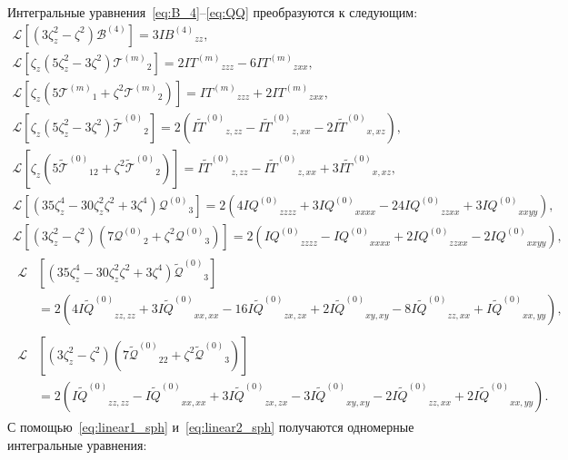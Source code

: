\documentclass[a4paper,12pt]{article}
\newcommand{\B}{\ensuremath{\mathcal{B}^{(4)}}}
\newcommand{\Q}{\ensuremath{\mathcal{Q}^{(0)}}}
\newcommand{\T}[1]{\ensuremath{\mathcal{T}^{(#1)}}}
\newcommand{\TT}{\ensuremath{\tilde{\mathcal{T}}^{(0)}}}
\newcommand{\QQ}{\ensuremath{\tilde{\mathcal{Q}}^{(0)}}}
\newcommand{\IF}[2][0]{\ensuremath{I{#2}^{(#1)}}}
\newcommand{\IFF}[1]{\ensuremath{I\tilde{#1}^{(0)}}}
\begin{document}
Интегральные уравнения~\eqref{eq:B_4}--\eqref{eq:QQ} преобразуются к следующим:
\begin{gather}
    \mathcal{L}\left[\left(3\zeta_z^2 - \zeta^2\right)\B\right]
        = 3\IF[4]{B}_{zz}, \\[6pt]
    \mathcal{L}\left[\zeta_z\left(5\zeta_z^2 - 3\zeta^2\right)\T{m}_2\right]
        = 2\IF[m]{T}_{zzz} - 6\IF[m]{T}_{zxx}, \\
    \mathcal{L}\left[\zeta_z\left(5\T{m}_1 + \zeta^2\T{m}_2\right)\right]
        = \IF[m]{T}_{zzz} + 2\IF[m]{T}_{zxx}, \\[6pt]
    \mathcal{L}\left[\zeta_z\left(5\zeta_z^2 - 3\zeta^2\right)\TT_2\right]
        = 2\left(\IFF{T}_{z,zz} - \IFF{T}_{z,xx} - 2\IFF{T}_{x,xz}\right), \\
    \mathcal{L}\left[\zeta_z\left(5\TT_{12} + \zeta^2\TT_2\right)\right]
        = \IFF{T}_{z,zz} - \IFF{T}_{z,xx} + 3\IFF{T}_{x,xz}, \\[6pt]
    \mathcal{L}\left[\left(35\zeta_z^4 - 30\zeta_z^2\zeta^2 + 3\zeta^4\right)\Q_3\right]
        = 2\left( 4\IF{Q}_{zzzz} + 3\IF{Q}_{xxxx} - 24\IF{Q}_{zzxx} + 3\IF{Q}_{xxyy} \right), \\
    \mathcal{L}\left[\left(3\zeta_z^2 - \zeta^2\right)\left(7\Q_2 + \zeta^2\Q_3\right)\right]
        = 2\left( \IF{Q}_{zzzz} - \IF{Q}_{xxxx} + 2\IF{Q}_{zzxx} - 2\IF{Q}_{xxyy} \right), \\[6pt]
    \begin{aligned}
    \mathcal{L}&\left[\left(35\zeta_z^4 - 30\zeta_z^2\zeta^2 + 3\zeta^4\right)\QQ_3\right] \\
        &= 2\left( 4\IFF{Q}_{zz,zz} + 3\IFF{Q}_{xx,xx} - 16\IFF{Q}_{zx,zx} + 2\IFF{Q}_{xy,xy} - 8\IFF{Q}_{zz,xx} + \IFF{Q}_{xx,yy} \right),
    \end{aligned}\\
    \begin{aligned}
    \mathcal{L}&\left[\left(3\zeta_z^2 - \zeta^2\right)\left(7\QQ_{22} + \zeta^2\QQ_3\right)\right] \\
        &= 2\left( \IFF{Q}_{zz,zz} - \IFF{Q}_{xx,xx} + 3\IFF{Q}_{zx,zx} - 3\IFF{Q}_{xy,xy} - 2\IFF{Q}_{zz,xx} + 2\IFF{Q}_{xx,yy} \right).
    \end{aligned}
\end{gather}
С помощью~\eqref{eq:linear1_sph} и~\eqref{eq:linear2_sph} получаются одномерные интегральные уравнения:
\end{document}
